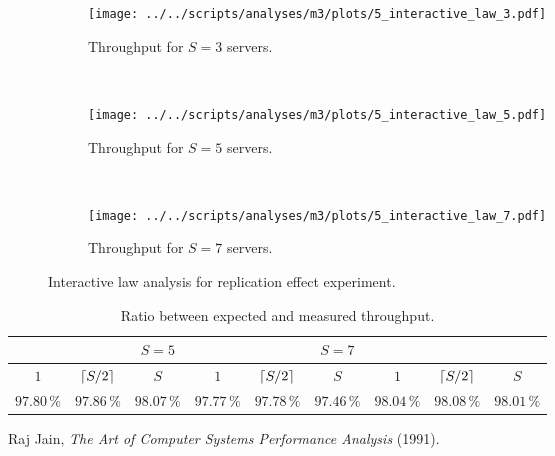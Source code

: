 \documentclass[11pt]{article}
\newcommand\task[1]{{\color[HTML]{999999}\subsection{Task}#1}}
\renewcommand\task[1]{}
\DeclarePairedDelimiter{\ceil}{\lceil}{\rceil}
\theoremstyle{definition}
\begin{document}
\begin{figure}[!h]
    \newcommand\wdt{10cm}
    \centering
    \begin{subfigure}[t]{\wdt}
        \centering
        \texttt{[image: ../../scripts/analyses/m3/plots/5\_interactive\_law\_3.pdf]}
        \caption{Throughput for $S=3$ servers.}\label{fig:5_il-3}
    \end{subfigure}
    \\\vspace{3mm}
    \begin{subfigure}[t]{\wdt}
        \centering
        \texttt{[image: ../../scripts/analyses/m3/plots/5\_interactive\_law\_5.pdf]}
        \caption{Throughput for $S=5$ servers.}\label{fig:5_il-5}
    \end{subfigure}
    \\\vspace{3mm}
    \begin{subfigure}[t]{\wdt}
        \centering
        \texttt{[image: ../../scripts/analyses/m3/plots/5\_interactive\_law\_7.pdf]}
        \caption{Throughput for $S=7$ servers.}\label{fig:5_il-7}
    \end{subfigure}
    \caption{Interactive law analysis for replication effect experiment.}
    \label{fig:5_il}
\end{figure}

\begin{table}[h]
    \centering
    \small
    {
        \begin{tabular}{|c|c|c||c|c|c||c|c|c|}
            \hline
            \rowcolor{Gray}
            \multicolumn{3}{|c||}{$S=3$} & \multicolumn{3}{c||}{$S=5$} & \multicolumn{3}{c|}{$S=7$} \\
            \hline
            \rowcolor{Gray}
            $1$ & $\ceil{S/2}$ & $S$ & $1$ & $\ceil{S/2}$ & $S$ & $1$ & $\ceil{S/2}$ & $S$ \\
            \hline
            $97.80\,\%$ & $97.86\,\%$ & $98.07\,\%$ & $97.77\,\%$ & $97.78\,\%$ & $97.46\,\%$ & $98.04\,\%$ & $98.08\,\%$ & $98.01\,\%$ \\
            \hline
        \end{tabular}
    }
    \caption{Ratio between expected and measured throughput.}
    \label{tab:5_il}
\end{table}

\task{
Length: 1-2 pages

Check the validity of all experiments from one of the three sections in your Milestone 2 report using the interactive law (choose a section in which your system has at least 9 different configurations). Analyze the results and explain them in detail.}

\clearpage

\begin{thebibliography}{4}
    
     Raj Jain, \textit{The Art of Computer Systems Performance Analysis} (1991).
    
\end{thebibliography}
\end{document}

